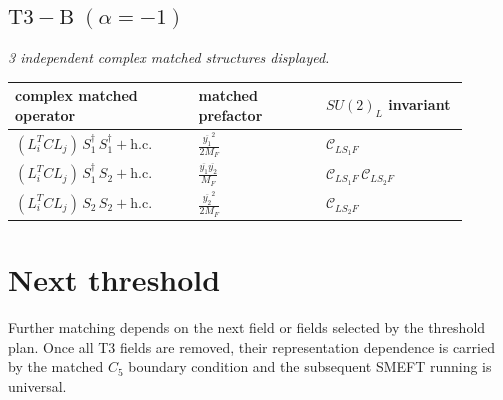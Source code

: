\documentclass[9pt]{article}
\begin{document}
\subsection*{$ \mathrm{T3-B}\;(\alpha=-1) $}
\textit{3 independent complex matched structures displayed. }
\begin{longtable}{@{}p{0.36\linewidth}p{0.25\linewidth}p{0.29\linewidth}@{}}
\toprule
complex matched operator & matched prefactor & $SU(2)_L$ invariant \\
\midrule
$ (L_i^T C L_j)\,S_1^\dagger\,S_1^\dagger+\mathrm{h.c.} $ & $ \frac{\overline{y_{1}}^{2}}{2 M_F} $ & $ \mathcal{C}_{LS_1F} $ \\
$ (L_i^T C L_j)\,S_1^\dagger\,S_2+\mathrm{h.c.} $ & $ \frac{\overline{y_{1}} \overline{y_{2}}}{M_F} $ & $ \mathcal{C}_{LS_1F}\,\mathcal{C}_{LS_2F} $ \\
$ (L_i^T C L_j)\,S_2\,S_2+\mathrm{h.c.} $ & $ \frac{\overline{y_{2}}^{2}}{2 M_F} $ & $ \mathcal{C}_{LS_2F} $ \\
\bottomrule
\end{longtable}
\section*{Next threshold}
Further matching depends on the next field or fields selected by the threshold plan.  Once all T3 fields are removed, their representation dependence is carried by the matched $C_5$ boundary condition and the subsequent SMEFT running is universal.
\end{document}
